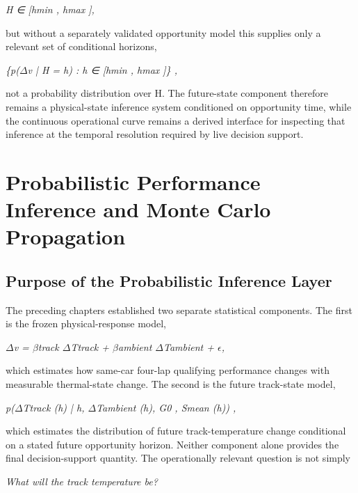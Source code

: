 \begin{center}\textit{H ∈ [hmin , hmax ],}\end{center}

but without a separately validated opportunity model this supplies only a relevant set of conditional horizons,

\begin{center}\textit{\{p(\ensuremath{\Delta}v | H = h) : h ∈ [hmin , hmax ]\} ,}\end{center}

not a probability distribution over H. The future-state component therefore remains a physical-state inference system conditioned on opportunity time, while the continuous operational curve remains a derived interface for inspecting that inference at the temporal resolution required by live decision support.

\section{Probabilistic Performance Inference and Monte Carlo Propagation}

\subsection{Purpose of the Probabilistic Inference Layer}
The preceding chapters established two separate statistical components. The first is the frozen physical-response model,

\begin{center}\textit{\ensuremath{\Delta}v = \ensuremath{\beta}track \ensuremath{\Delta}Ttrack + \ensuremath{\beta}ambient \ensuremath{\Delta}Tambient + \ensuremath{\epsilon},}\end{center}

which estimates how same-car four-lap qualifying performance changes with measurable thermal-state change. The second is the future track-state model,

\begin{center}\textit{p(\ensuremath{\Delta}Ttrack (h) | h, \ensuremath{\Delta}Tambient (h), G0 , Smean (h)) ,}\end{center}

which estimates the distribution of future track-temperature change conditional on a stated future opportunity horizon. Neither component alone provides the final decision-support quantity. The operationally relevant question is not simply

\begin{center}\textit{What will the track temperature be?}\end{center}

